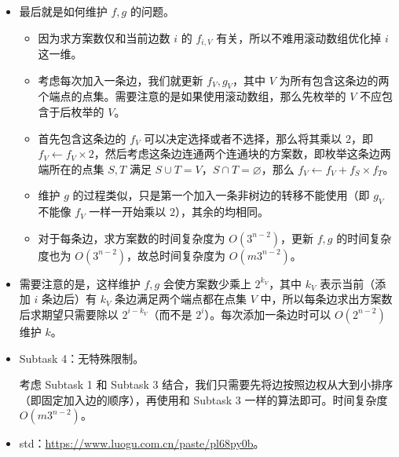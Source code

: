 \documentclass[10pt,aspectratio=43,mathserif]{beamer}
\begin{document}
\begin{frame}

	\begin{itemize} \setlength{\parskip}{0.3\baselineskip}

		\item 最后就是如何维护 $f, g$ 的问题。

		\begin{itemize} \setlength{\parskip}{0.3\baselineskip}

			\item 因为求方案数仅和当前边数 $i$ 的 $f_{i,V}$ 有关，所以不难用滚动数组优化掉 $i$ 这一维。

			\item 考虑每次加入一条边，我们就更新 $f_V, g_V$，其中 $V$ 为所有包含这条边的两个端点的点集。需要注意的是如果使用滚动数组，那么先枚举的 $V$ 不应包含于后枚举的 $V$。

			\item 首先包含这条边的 $f_V$ 可以决定选择或者不选择，那么将其乘以 $2$，即 $f_V\gets f_V\times 2$，然后考虑这条边连通两个连通块的方案数，即枚举这条边两端所在的点集 $S,T$ 满足 $S \cup T=V$，$S\cap T=\varnothing$，那么 $f_V\gets f_V+f_S\times f_T$。

			\item 维护 $g$ 的过程类似，只是第一个加入一条非树边的转移不能使用（即 $g_V$ 不能像 $f_V$ 一样一开始乘以 $2$），其余的均相同。

			\item 对于每条边，求方案数的时间复杂度为 $O(3^{n-2})$，更新 $f,g$ 的时间复杂度也为 $O(3^{n-2})$，故总时间复杂度为 $O(m 3^{n-2})$。

		\end{itemize}

		\item {\footnotesize 需要注意的是，这样维护 $f,g$ 会使方案数少乘上 $2^{k_V}$，其中 $k_V$ 表示当前（添加 $i$ 条边后）有 $k_V$ 条边满足两个端点都在点集 $V$ 中，所以每条边求出方案数后求期望只需要除以 $2^{i-k_V}$（而不是 $2^i$）。每次添加一条边时可以 $O(2^{n-2})$ 维护 $k$。}

	\end{itemize}

\end{frame}

\begin{frame}

	\begin{itemize} \setlength{\parskip}{0.3\baselineskip}

		\item Subtask 4：无特殊限制。

		考虑 Subtask 1 和 Subtask 3 结合，我们只需要先将边按照边权从大到小排序（即固定加入边的顺序），再使用和 Subtask 3 一样的算法即可。时间复杂度 $O(m 3^{n-2})$。

		\item std：\url{https://www.luogu.com.cn/paste/pl68py0b}。

	\end{itemize}

\end{frame}
\end{document}
